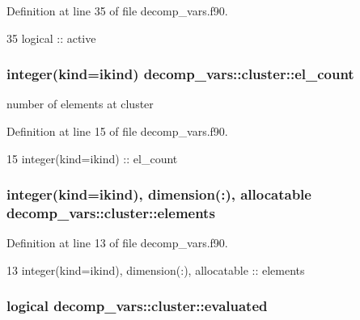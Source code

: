 Definition at line 35 of file decomp\+\_\+vars.\+f90.


\begin{DoxyCode}
35     \textcolor{keywordtype}{logical} :: active
\end{DoxyCode}
\subsubsection[{el\+\_\+count}]{\setlength{\rightskip}{0pt plus 5cm}integer(kind=ikind) decomp\+\_\+vars\+::cluster\+::el\+\_\+count\hspace{0.3cm}{\ttfamily [private]}}\label{structdecomp__vars_1_1cluster_a14a956c4b26f6c4da3a0bc0f55d46187}


number of elements at cluster 



Definition at line 15 of file decomp\+\_\+vars.\+f90.


\begin{DoxyCode}
15     \textcolor{keywordtype}{integer(kind=ikind)} :: el\_count
\end{DoxyCode}
\subsubsection[{elements}]{\setlength{\rightskip}{0pt plus 5cm}integer(kind=ikind), dimension(\+:), allocatable decomp\+\_\+vars\+::cluster\+::elements\hspace{0.3cm}{\ttfamily [private]}}\label{structdecomp__vars_1_1cluster_a625a20993e91d255156b9d48c87a20d1}


Definition at line 13 of file decomp\+\_\+vars.\+f90.


\begin{DoxyCode}
13     \textcolor{keywordtype}{integer(kind=ikind)}, \textcolor{keywordtype}{dimension(:)}, \textcolor{keywordtype}{allocatable} :: elements
\end{DoxyCode}
\subsubsection[{evaluated}]{\setlength{\rightskip}{0pt plus 5cm}logical decomp\+\_\+vars\+::cluster\+::evaluated\hspace{0.3cm}{\ttfamily [private]}}\label{structdecomp__vars_1_1cluster_aabadc83f577db1e8d25234ce1d5c0784}


